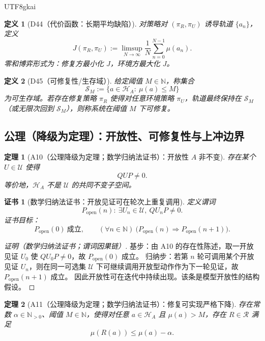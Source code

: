 \documentclass[12pt]{article}
\newtheorem{definition}{定义}[section]
\newtheorem{theorem}{定理}[section]
\newtheorem{Certificate}{证书}[section]
\begin{document}
\begin{CJK*}{UTF8}{gkai}
\begin{definition}[D44（代价函数：长期平均缺陷）]
\label{def:D44}
对策略对 $(\pi_R,\pi_U)$ 诱导轨道 $\{a_n\}$，定义
\[
J(\pi_R,\pi_U):=\limsup_{N\to\infty}\frac1N\sum_{n=0}^{N-1}\mu(a_n).
\]
零和博弈形式为：修复方最小化 $J$，环境方最大化 $J$。
\end{definition}

\begin{definition}[D45（可修复性/生存域）]
\label{def:D45}
给定阈值 $M\in\mathbb N$，称集合
\[
\mathcal S_M:=\{a\in\mathcal H_A:\ \mu(a)\le M\}
\]
为可生存域。若存在修复策略 $\pi_R$ 使得对任意环境策略 $\pi_U$，轨道最终保持在 $\mathcal S_M$（或无限次回到 $\mathcal S_M$），则称系统在阈值 $M$ 下\emph{可修复}。
\end{definition}

\subsection{公理（降级为定理）：开放性、可修复性与上冲边界}

\begin{theorem}[A10（公理降级为定理；数学归纳法证书）：开放性 $A$ 非不变]
\label{thm:A10}
存在某个 $U\in\mathcal U$ 使得
\[
QUP\neq 0.
\]
等价地，$\mathcal H_A$ 不是 $\mathcal U$ 的共同不变子空间。
\end{theorem}

\begin{Certificate}[数学归纳法证书：开放见证可在轮次上重复调用]
\label{cert:A10}
定义谓词
\[
P_{\mathrm{open}}(n):\ \exists U_n\in\mathcal U,\ Q U_n P\neq 0.
\]
证书目标：
\[
P_{\mathrm{open}}(0)\ \text{成立},\qquad (\forall n\in\mathbb N)\ \bigl(P_{\mathrm{open}}(n)\Rightarrow P_{\mathrm{open}}
  (n+1)\bigr).
\]
\end{Certificate}

\begin{proof}[证明（数学归纳法证书；谓词因果链）]
基步：由 A10 的存在性陈述，取一开放见证 $U_0$ 使 $QU_0P\neq0$，故 $P_{\mathrm{open}}(0)$ 成立。
归纳步：若第 $n$ 轮可调用某个开放见证 $U_n$，则在同一可选集 $\mathcal U$ 下可继续调用开放型动作作为下一轮见证，故 $P_{\mathrm{open}}(n+1)$ 成立。
因此开放性可在迭代中持续出现。该条是模型开放性的结构假设。
\end{proof}

\begin{theorem}[A11（公理降级为定理；数学归纳法证书）：修复可实现严格下降]
\label{thm:A11}
存在常数 $\alpha\in\mathbb N_{>0}$、阈值 $M\in\mathbb N$，使得对任意 $a\in\mathcal H_A$ 且 $\mu(a)>M$，存在 $R\in\mathcal R$ 满足
\[
\mu(R(a))\le \mu(a)-\alpha.
\]
\end{theorem}


\end{CJK*}
\end{document}
